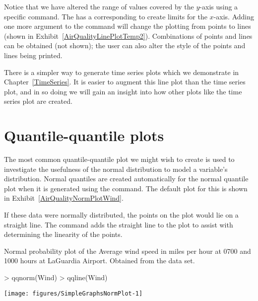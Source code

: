 Notice that we have altered the range of values covered by the $y$-axis using a specific command. The  has a corresponding  to create limits for the $x$-axis. Adding one more argument to the  command will change the plotting from points to lines (shown in Exhibit~\ref{AirQualityLinePlotTemp2}). Combinations of points and lines can be obtained (not shown); the user can also alter the style of the points and lines being printed. 
 
There is a simpler way to generate time series plots which we demonstrate in Chapter~\ref{TimeSeries}. It is easier to augment this line plot than the time series plot, and in so doing we will gain an insight into how other plots like the time series plot are created. 
 
 
\section{Quantile-quantile plots} 
 
The most common quantile-quantile plot we might wish to create is used to investigate the usefulness of the normal distribution to model a variable's distribution. Normal quantiles are created automatically for the normal quantile plot when it is generated using the  command. The default plot for this is shown in Exhibit~\ref{AirQualityNormPlotWind}. 
 
If these data were normally distributed, the points on the plot would lie on a straight line. The  command adds the straight line to the plot to assist with determining the linearity of the points. 
 
\begin{exhibit} 
\begin{center} 
\caption{Normal probability plot of the Average wind speed in miles per hour at 0700 and 1000 hours at LaGuardia Airport. Obtained from the  data set.} 
\label{AirQualityNormPlotWind} 

\begin{Schunk}
\begin{Sinput}
> qqnorm(Wind) 
> qqline(Wind) 
\end{Sinput}

\texttt{[image: figures/SimpleGraphsNormPlot-1]} \end{Schunk}

\end{center} 
\end{exhibit} 

